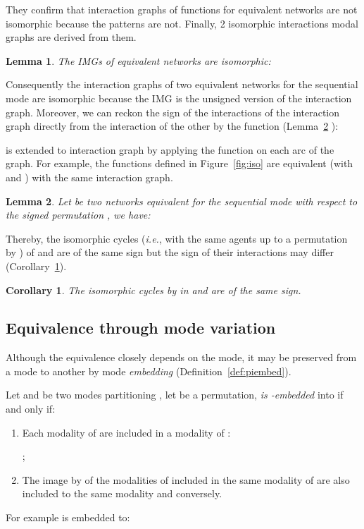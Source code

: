 \documentclass[12pt]{elsarticle}
\newtheorem{lemma}{Lemma}
\newtheorem{corollary}{Corollary}
\newcommand{\abbrev}[1]{#1, \relax}
\newcommand{\ie}[0]{\abbrev{\textit{i.e.}}}
\begin{document}
They confirm that interaction graphs of functions for equivalent networks are not isomorphic because the patterns are not. Finally, 2 isomorphic interactions modal graphs are derived from them.
\begin{lemma}
\label{lem:invariant} 
 The IMGs of equivalent networks are isomorphic: 

\end{lemma}
Consequently the interaction graphs of two equivalent networks for the sequential mode are isomorphic because 
 the IMG is the unsigned version of the interaction graph. Moreover, we can reckon the sign of the interactions of the interaction graph directly from the interaction of the other by the function  (Lemma~\ref{lem:equiv-async} ):

 is extended to interaction graph by applying the function on each arc of the graph. For example, the functions defined in Figure~\ref{fig:iso} are equivalent (with  and ) with the same interaction graph.

\begin{lemma}
\label{lem:equiv-async}
Let  be two networks equivalent for the sequential mode with respect to the signed permutation , we have:  
\end{lemma}
Thereby, the isomorphic cycles (\ie with the same agents up to a permutation by ) of  and  are of the same sign but the sign of their interactions may differ (Corollary~\ref{cor:equiv-async}).
\begin{corollary}
\label{cor:equiv-async}
The isomorphic cycles by  in  and  are of the same sign.
\end{corollary}

\subsection{Equivalence through mode variation}
Although the equivalence closely depends on the mode, it may be preserved from a mode to another by mode \emph{embedding} (Definition~\ref{def:piembed}).
\begin{definition}
\label{def:piembed}
Let  and  be two modes partitioning , let  be a permutation, \emph{ is -embedded} into  if and only if: 
\begin{enumerate}
\item Each modality of  are included in a modality of :

; \label{cond1}

\item The image by  of the modalities of  included in the same modality of  are also included to the same modality  and conversely. 

 \label{cond2}
\end{enumerate}
\end{definition} 
For example  is embedded to:
\end{document}
